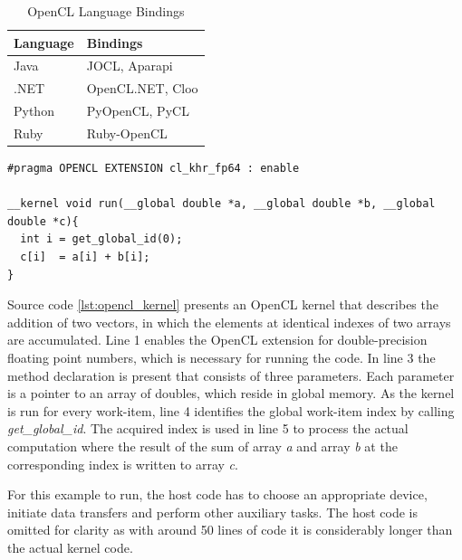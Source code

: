 \begin{table}[htb]
	\centering
	\begin{adjustbox}{width=0.35\textwidth}
		\small
		\begin{tabular}{l | l}
			\textbf{Language}	& \textbf{Bindings}   \\
			\hline
			Java        &  JOCL, Aparapi\\
			.NET        &  OpenCL.NET, Cloo\\
			Python      &  PyOpenCL, PyCL\\
			Ruby	    &  Ruby-OpenCL\\


		\end{tabular}
	\end{adjustbox}

	\caption{OpenCL Language Bindings}
	\label{table:opencl_language_bindings}
\end{table}

\begin{minipage}{\linewidth}

\begin{lstlisting}[caption=OpenCL Vector Addition Kernel,captionpos=b,label={lst:opencl_kernel}]
#pragma OPENCL EXTENSION cl_khr_fp64 : enable

__kernel void run(__global double *a, __global double *b, __global double *c){
  int i = get_global_id(0);
  c[i]  = a[i] + b[i];
}
\end{lstlisting}
\end{minipage}
Source code \ref{lst:opencl_kernel} presents an OpenCL kernel that describes the addition of two vectors, in which the elements at identical indexes of two arrays are accumulated. Line 1 enables the OpenCL extension for double-precision floating point numbers, which is necessary for running the code. In line 3 the method declaration is present that consists of three parameters. Each parameter is a pointer to an array of doubles, which reside in global memory. As the kernel is run for every work-item, line 4 identifies the global work-item index by calling \textit{get\_global\_id}. The acquired index is used in line 5 to process the actual computation where the result of the sum of array \textit{a} and array \textit{b} at the corresponding index is written to array \textit{c}.

For this example to run, the host code has to choose an appropriate device, initiate data transfers and perform other auxiliary tasks. The host code is omitted for clarity as with around 50 lines of code it is considerably longer than the actual kernel code.


